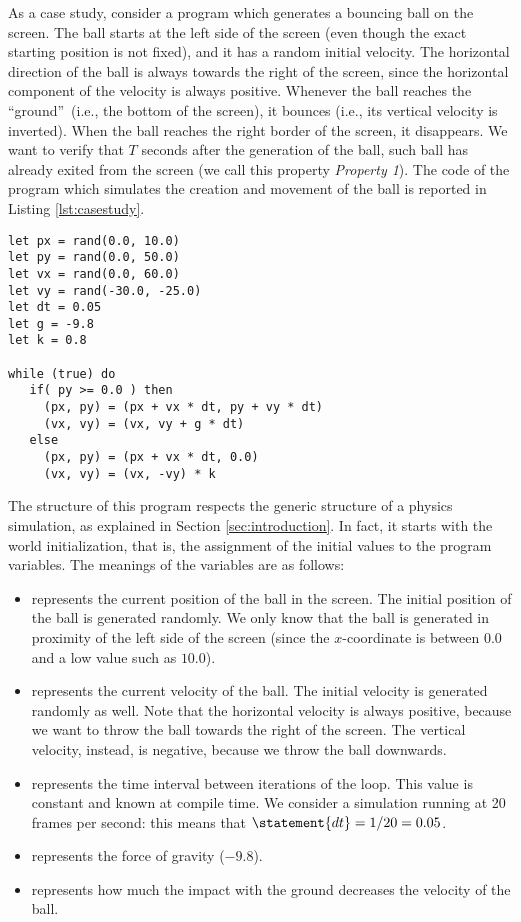 As a case study, consider a program which generates a bouncing ball on the screen. The ball starts at the left side of the screen (even though the exact starting position is not fixed), and it has a random initial velocity. The horizontal direction of the ball is always towards the right of the screen, since the horizontal component of the velocity is always positive. Whenever the ball reaches the \textquotedblleft ground\textquotedblright\ (i.e., the bottom of the screen), it bounces (i.e., its vertical velocity is inverted). When the ball reaches the right border of the screen, it disappears. We want to verify that $T$ seconds after the generation of the ball, such ball has already exited from the screen (we call this property \emph{Property 1}). The code of the program which simulates the creation and movement of the ball is reported in Listing \ref{lst:casestudy}. 

\begin{lstlisting}[caption={Case study: bouncing-ball code},label={lst:casestudy}]
let px = rand(0.0, 10.0)
let py = rand(0.0, 50.0)
let vx = rand(0.0, 60.0)
let vy = rand(-30.0, -25.0)
let dt = 0.05
let g = -9.8
let k = 0.8

while (true) do
   if( py >= 0.0 ) then 
     (px, py) = (px + vx * dt, py + vy * dt)
     (vx, vy) = (vx, vy + g * dt)
   else
     (px, py) = (px + vx * dt, 0.0)
     (vx, vy) = (vx, -vy) * k
\end{lstlisting}

The structure of this program respects the generic structure of a physics simulation, as explained in Section \ref{sec:introduction}. In fact, it starts with the world initialization, that is, the assignment of the initial values to the program variables. The meanings of the variables are as follows:
\begin{itemize}
\item {} represents the current position of the ball in the screen. The initial position of the ball is generated randomly. We only know that the ball is generated in proximity of the left side of the screen (since the $x$-coordinate is between $0.0$ and a low value such as $10.0$).
\item {} represents the current velocity of the ball. The initial velocity is generated randomly as well. Note that the horizontal velocity is always positive, because we want to throw the ball towards the right of the screen. The vertical velocity, instead, is negative, because we throw the ball downwards.
\item {} represents the time interval between iterations of the loop. This value is constant and known at compile time. We consider a simulation running at 20 frames per second: this means that $\statement{dt}=1/20=0.05$.
\item {} represents the force of gravity ($-9.8$).
\item {} represents how much the impact with the ground decreases the velocity of the ball.
\end{itemize}

